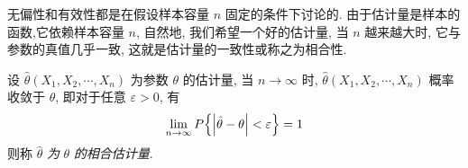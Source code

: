 无偏性和有效性都是在假设样本容量 $n$ 固定的条件下讨论的.
由于估计量是样本的函数,它依赖样本容量 $n$, 自然地, 我们希望一个好的估计量, 当 $n$ 越来越大时, 它与参数的真值几乎一致, 
这就是估计量的一致性或称之为相合性.

\begin{definition}[一致性]
    设 $ \hat{\theta}\left(X_{1}, X_{2}, \cdots, X_{n}\right) $ 为参数 $ \theta $ 的估计量, 当 $ n \rightarrow \infty $ 时, $\hat{\theta}\left(X_{1}, X_{2}, \cdots, X_{n}\right) $ 概率收敛于
    $ \theta $, 即对于任意 $ \varepsilon>0 $, 有
    $$\lim _{n \rightarrow \infty} P\qty{\qty|\hat{\theta}-\theta|<\varepsilon}=1$$
    则称 $ \hat{\theta} $ \textit{为} $ \theta $ \textit{的相合估计量}.
\end{definition}

